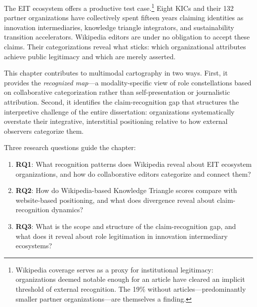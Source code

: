 \documentclass[../main.tex]{subfiles}
\begin{document}
The EIT ecosystem offers a productive test case.\footnote{Wikipedia coverage serves as a proxy for institutional legitimacy: organizations deemed notable enough for an article have cleared an implicit threshold of external recognition. The 19\% without articles---predominantly smaller partner organizations---are themselves a finding.} Eight KICs and their 132 partner organizations have collectively spent fifteen years claiming identities as innovation intermediaries, knowledge triangle integrators, and sustainability transition accelerators. Wikipedia editors are under no obligation to accept these claims. Their categorizations reveal what sticks: which organizational attributes achieve public legitimacy and which are merely asserted.

This chapter contributes to multimodal cartography in two ways. First, it provides the \emph{recognized map}---a modality-specific view of role constellations based on collaborative categorization rather than self-presentation or journalistic attribution. Second, it identifies the claim-recognition gap that structures the interpretive challenge of the entire dissertation: organizations systematically overstate their integrative, interstitial positioning relative to how external observers categorize them.

Three research questions guide the chapter:

\begin{enumerate}
    \item \textbf{RQ1}: What recognition patterns does Wikipedia reveal about EIT ecosystem organizations, and how do collaborative editors categorize and connect them?
    \item \textbf{RQ2}: How do Wikipedia-based Knowledge Triangle scores compare with website-based positioning, and what does divergence reveal about claim-recognition dynamics?
    \item \textbf{RQ3}: What is the scope and structure of the claim-recognition gap, and what does it reveal about role legitimation in innovation intermediary ecosystems?
\end{enumerate}
\end{document}
